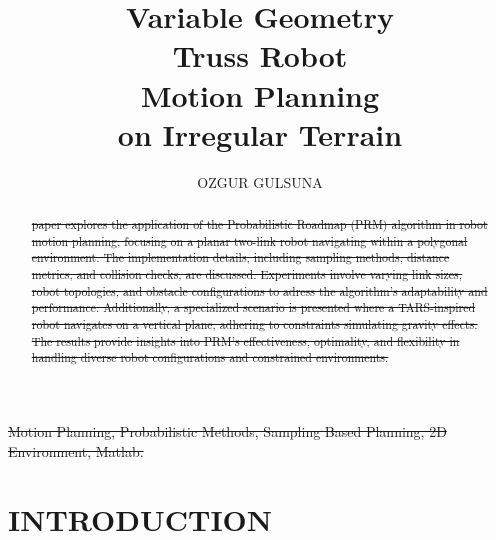 \documentclass{IEEEtaes}
\begin{document}
\title{{\fontsize{22}{10}\selectfont \textbf{Variable Geometry}} \\ 
       {\fontsize{33.4}{10} \textbf{Truss Robot}} \\
       {\fontsize{24.9}{10} \textbf{Motion Planning} }\\
       on Irregular Terrain}


\author{OZGUR GULSUNA}
\member{}



\editor{}
\supplementary{}




\maketitle

\begin{abstract}\st{ paper explores the application of the Probabilistic Roadmap (PRM) algorithm in robot motion planning, focusing on a planar two-link robot navigating within a polygonal environment. The implementation details, including sampling methods, distance metrics, and collision checks, are discussed. Experiments involve varying link sizes, robot topologies, and obstacle configurations to adress the algorithm's adaptability and performance. Additionally, a specialized scenario is presented where a TARS-inspired robot navigates on a vertical plane, adhering to constraints simulating gravity effects. The results provide insights into PRM's effectiveness, optimality, and flexibility in handling diverse robot configurations and constrained environments.}
\end{abstract}

\begin{IEEEkeywords}\st{Motion Planning, Probabilistic Methods, Sampling Based Planning, 2D Environment, Matlab.}
\end{IEEEkeywords}
\vfill\null

\section{\normalsize INTRODUCTION}
\end{document}
